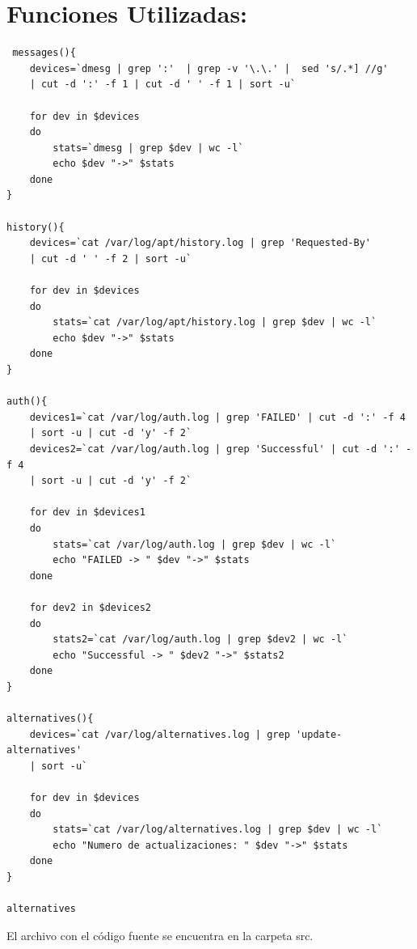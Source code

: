 \documentclass[a4paper, 11pt, oneside]{article}
\begin{document}
\section*{Funciones Utilizadas:}
\begin{verbatim}
 messages(){
	devices=`dmesg | grep ':'  | grep -v '\.\.' |  sed 's/.*] //g' 
	| cut -d ':' -f 1 | cut -d ' ' -f 1 | sort -u`

	for dev in $devices
	do
		stats=`dmesg | grep $dev | wc -l`
		echo $dev "->" $stats
	done
}

history(){
	devices=`cat /var/log/apt/history.log | grep 'Requested-By' 
	| cut -d ' ' -f 2 | sort -u`

	for dev in $devices
	do
		stats=`cat /var/log/apt/history.log | grep $dev | wc -l`
		echo $dev "->" $stats
	done
}

auth(){
	devices1=`cat /var/log/auth.log | grep 'FAILED' | cut -d ':' -f 4 
	| sort -u | cut -d 'y' -f 2`
	devices2=`cat /var/log/auth.log | grep 'Successful' | cut -d ':' -f 4 
	| sort -u | cut -d 'y' -f 2`

	for dev in $devices1
	do
		stats=`cat /var/log/auth.log | grep $dev | wc -l`
		echo "FAILED -> " $dev "->" $stats
	done

	for dev2 in $devices2
	do
		stats2=`cat /var/log/auth.log | grep $dev2 | wc -l`
		echo "Successful -> " $dev2 "->" $stats2
	done
}

alternatives(){
	devices=`cat /var/log/alternatives.log | grep 'update-alternatives' 
	| sort -u`

	for dev in $devices
	do
		stats=`cat /var/log/alternatives.log | grep $dev | wc -l`
		echo "Numero de actualizaciones: " $dev "->" $stats
	done
}

alternatives
\end{verbatim}

El archivo con el código fuente se encuentra en la carpeta src.
\end{document}
